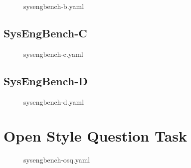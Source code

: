 \begin{figure}[htbp]
\centering
\begin{scriptsize}

\end{scriptsize}
\caption{sysengbench-b.yaml}
\label{lst:sysengbench-b}
\end{figure}

\clearpage
\subsection{SysEngBench-C}

\begin{figure}[htbp]
\centering
\begin{scriptsize}

\end{scriptsize}
\caption{sysengbench-c.yaml}
\label{lst:sysengbench-c}
\end{figure}

\clearpage
\subsection{SysEngBench-D}

\begin{figure}[htbp]
\centering
\begin{scriptsize}

\end{scriptsize}
\caption{sysengbench-d.yaml}
\label{lst:sysengbench-d}
\end{figure}


\clearpage
\section{Open Style Question Task}
\label{app:tasks_osq}

\begin{figure}[htbp]
\centering
\begin{scriptsize}

\end{scriptsize}
\caption{sysengbench-osq.yaml}
\label{lst:sysengbench-osq}
\end{figure}






























